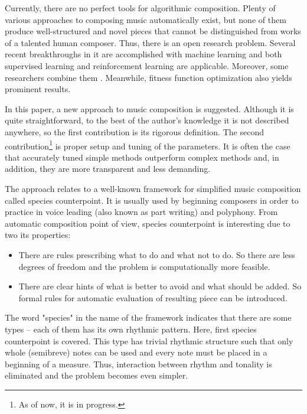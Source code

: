 \documentclass{article}
\begin{document}
Currently, there are no perfect tools for algorithmic composition. Plenty of various approaches to composing music automatically exist, but none of them produce well-structured and novel pieces that cannot be distinguished from works of a talented human composer. Thus, there is an open research problem. Several recent breakthroughs in it are accomplished with machine learning and both supervised learning \cite{johnson2017generating, payne2019musenet} and reinforcement learning \cite{yi2007automatic, smith2012reinforcement} are applicable. Moreover, some researchers combine them \cite{jaques2016generating, kotecha2018bach, kumar2019polyphonic}. Meanwhile, fitness function optimization also yields prominent results\cite{herremans2012first, herremans2013fifth}.

In this paper, a new approach to music composition is suggested. Although it is quite straightforward, to the best of the author's knowledge it is not described anywhere, so the first contribution is its rigorous definition. The second contribution\footnote{As of now, it is in progress.} is proper setup and tuning of the parameters. It is often the case that accurately tuned simple methods outperform complex methods \cite{dacrema2019are} and, in addition, they are more transparent and less demanding.

The approach relates to a well-known framework for simplified music composition called species counterpoint. It is usually used by beginning composers in order to practice in voice leading (also known as part writing) and polyphony. From automatic composition point of view, species counterpoint is interesting due to two its properties:
\begin{itemize}
	\item There are rules prescribing what to do and what not to do. So there are less degrees of freedom and the problem is computationally more feasible.
	\item There are clear hints of what is better to avoid and what should be added. So formal rules for automatic evaluation of resulting piece can be introduced.
\end{itemize}

The word "species" in the name of the framework indicates that there are some types -- each of them has its own rhythmic pattern. Here, first species counterpoint is covered. This type has trivial rhythmic structure such that only whole (semibreve) notes can be used and every note must be placed in a beginning of a measure. Thus, interaction between rhythm and tonality is eliminated and the problem becomes even simpler. 
\end{document}
